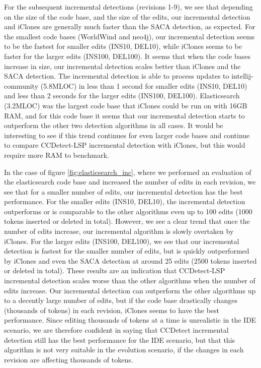For the subsequent incremental detections (revisions 1-9), we see that depending on the
size of the code base, and the size of the edits, our incremental detection and iClones
are generally much faster than the SACA detection, as expected. For the smallest code
bases (WorldWind and neo4j), our incremental detection seems to be the fastest for smaller
edits (INS10, DEL10), while iClones seems to be faster for the larger edits (INS100,
DEL100). It seems that when the code bases increase in size, our incremental detection
scales better than iClones and the SACA detection. The incremental detection is able to
process updates to intellij-community (5.8MLOC) in less than 1 second for smaller edits
(INS10, DEL10) and less than 2 seconds for the larger edits (INS100, DEL100).
Elasticsearch (3.2MLOC) was the largest code base that iClones could be run on with 16GB
RAM, and for this code base it seems that our incremental detection starts to outperform
the other two detection algorithms in all cases. It would be interesting to see if this
trend continues for even larger code bases and continue to compare CCDetect-LSP
incremental detection with iClones, but this would require more RAM to benchmark. 

In the case of figure \ref{fig:elasticsearch_inc}, where we performed an evaluation of the
elasticsearch code base and increased the number of edits in each revision, we see that
for a smaller number of edits, our incremental detection has the best performance. For the
smaller edits (INS10, DEL10), the incremental detection outperforms or is comparable to
the other algorithms even up to 100 edits (1000 tokens inserted or deleted in total).
However, we see a clear trend that once the number of edits increase, our incremental
algorithm is slowly overtaken by iClones. For the larger edits (INS100, DEL100), we see
that our incremental detection is fastest for the smaller number of edits, but is quickly
outperformed by iClones and even the SACA detection at around 25 edits (2500 tokens
inserted or deleted in total). These results are an indication that CCDetect-LSP
incremental detection scales worse than the other algorithms when the number of edits
increase. Our incremental detection can outperform the other algorithms up to a decently
large number of edits, but if the code base drastically changes (thousands of tokens) in
each revision, iClones seems to have the best performance. Since editing thousands of
tokens at a time is unrealistic in the IDE scenario, we are therefore confident in saying
that CCDetect incremental detection still has the best performance for the IDE scenario,
but that this algorithm is not very suitable in the evolution scenario, if the changes in
each revision are affecting thousands of tokens.

